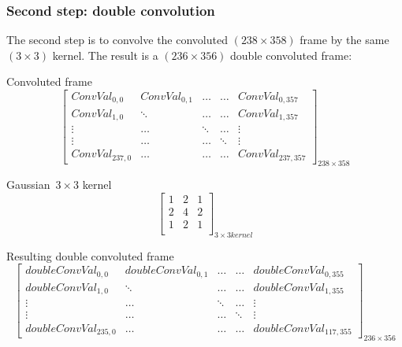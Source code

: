 \subsubsection{Second step: double convolution}

The second step is to convolve the convoluted $(238\times 358)$ frame by the same $(3\times 3)$ kernel. The result is a $(236\times 356)$ double convoluted frame:

\vspace{10mm}

\noindent\begin{minipage}{.3\textwidth}
Convoluted frame
\[
\begin{bmatrix}

ConvVal_{0,0} & ConvVal_{0,1} & \ldots & \ldots & ConvVal_{0,357}\\

ConvVal_{1,0} & \ddots & \ldots & \ldots & ConvVal_{1,357}\\

\vdots & \ldots & \ddots & \ldots & \vdots\\

\vdots & \ldots & \ldots & \ddots & \vdots\\

ConvVal_{237,0} & \ldots & \ldots  & \ldots & ConvVal_{237,357}

\end{bmatrix}_{238\times 358}
\]
\end{minipage}\hfill
\begin{minipage}{.3\textwidth}
Gaussian~$3\times 3$ kernel
\[
\begin{bmatrix}

1 & 2 & 1\\

2 & 4 & 2\\

1 & 2 & 1\\

\end{bmatrix}_{3\times 3 kernel}
\]
\end{minipage}

\vspace{10mm}


Resulting double convoluted frame
\[
\begin{bmatrix}

doubleConvVal_{0,0} & doubleConvVal_{0,1} & \ldots & \ldots & doubleConvVal_{0,355}\\

doubleConvVal_{1,0} & \ddots & \ldots & \ldots & doubleConvVal_{1,355}\\

\vdots & \ldots & \ddots & \ldots & \vdots\\

\vdots & \ldots & \ldots & \ddots & \vdots\\

doubleConvVal_{235,0} & \ldots & \ldots  & \ldots & doubleConvVal_{117,355}

\end{bmatrix}_{236\times 356}
\]



